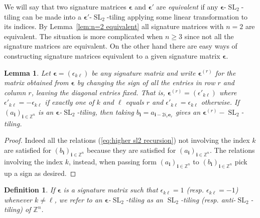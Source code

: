 \documentclass[12pt]{amsart}
\newtheorem{definition}[theorem]{Definition}
\newtheorem{lemma}[theorem]{Lemma}
\newcommand{\bepsilon}{\boldsymbol{\epsilon}}
\newcommand{\be}{\boldsymbol{e}}
\newcommand{\bi}{\boldsymbol{i}}
\newcommand{\SL}{\operatorname{SL}}
\newcommand{\ZZ}{\mathbb{Z}}
\begin{document}
  We will say that two signature matrices $\bepsilon$ and $\bepsilon'$ are \emph{equivalent} if any $\bepsilon$-$\SL_2$-tiling can be made into a $\bepsilon'$-$\SL_2$-tiling applying some linear transformation to its indices.
  By Lemma~\ref{lem:n=2 equivalent} all signature matrices with $n=2$ are equivalent.
  The situation is more complicated when $n\geq 3$ since not all the signature matrices are equivalent.
  On the other hand there are easy ways of constructing signature matrices equivalent to a given signature matrix $\bepsilon$.
  \begin{lemma}\label{le:flip}
    Let $\bepsilon=(\epsilon_{k\ell})$ be any signature matrix and write $\bepsilon^{(r)}$ for the matrix obtained from $\bepsilon$ by changing the sign of all the entries in row $r$ and column $r$, leaving the diagonal entries fixed. 
    That is, $\bepsilon^{(r)} =(\epsilon'_{k\ell})$ where $\epsilon'_{k\ell}=-\epsilon_{k\ell}$ if exactly one of $k$ and $\ell$ equals $r$ and $\epsilon'_{k\ell}=\epsilon_{k\ell}$ otherwise. 
    If $(a_{\bi})_{\bi\in\ZZ^n}$ is an $\bepsilon$-$\SL_2$-tiling, then taking $b_{\bi}=a_{\bi-2i_r\be_r}$ gives an $\bepsilon^{(r)}-\SL_2$-tiling.
  \end{lemma}
  \begin{proof}
    Indeed all the relations (\ref{eq:higher sl2 recursion}) not involving the index $k$ are satisfied for $(b_{\bi})_{\bi\in\ZZ^n}$ because they are satisfied for $(a_{\bi})_{\bi\in\ZZ^n}$.
    The relations involving the index $k$, instead, when passing form $(a_{\bi})_{\bi\in\ZZ^n}$ to $(b_{\bi})_{\bi\in\ZZ^n}$ pick up a sign as desired.
  \end{proof}
  \begin{definition}
    If $\bepsilon$ is a signature matrix such that $\epsilon_{k\ell}=1$ (resp. $\epsilon_{k\ell}=-1$) whenever $k\neq\ell$, we refer to an $\bepsilon$-$\SL_2$-tiling as an \emph{$\SL_2$-tiling} (resp. \emph{anti-$\SL_2$-tiling}) of $\ZZ^n$.
  \end{definition}
\end{document}
